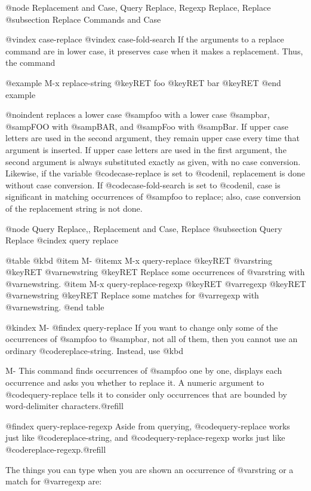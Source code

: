 {{{{{{{{{{{{{{{{{{{@node Replacement and Case, Query Replace, Regexp Replace, Replace
@subsection Replace Commands and Case

@vindex case-replace
@vindex case-fold-search
  If the arguments to a replace command are in lower case, it preserves
case when it makes a replacement.  Thus, the command

@example
M-x replace-string @key{RET} foo @key{RET} bar @key{RET}
@end example

@noindent
replaces a lower case @samp{foo} with a lower case @samp{bar}, @samp{FOO}
with @samp{BAR}, and @samp{Foo} with @samp{Bar}.  If upper case letters are
used in the second argument, they remain upper case every time that
argument is inserted.  If upper case letters are used in the first
argument, the second argument is always substituted exactly as given, with
no case conversion.  Likewise, if the variable @code{case-replace} is set
to @code{nil}, replacement is done without case conversion.  If
@code{case-fold-search} is set to @code{nil}, case is significant in
matching occurrences of @samp{foo} to replace; also, case conversion of the
replacement string is not done.

@node Query Replace,, Replacement and Case, Replace
@subsection Query Replace
@cindex query replace

@table @kbd
@item M-%
@itemx M-x query-replace @key{RET} @var{string} @key{RET} @var{newstring} @key{RET}
Replace some occurrences of @var{string} with @var{newstring}.
@item M-x query-replace-regexp @key{RET} @var{regexp} @key{RET} @var{newstring} @key{RET}
Replace some matches for @var{regexp} with @var{newstring}.
@end table

@kindex M-%
@findex query-replace
  If you want to change only some of the occurrences of @samp{foo} to
@samp{bar}, not all of them, then you cannot use an ordinary
@code{replace-string}.  Instead, use @kbd{M-%
This command finds occurrences of @samp{foo} one by one, displays each
occurrence and asks you whether to replace it.  A numeric argument to
@code{query-replace} tells it to consider only occurrences that are bounded
by word-delimiter characters.@refill

@findex query-replace-regexp
  Aside from querying, @code{query-replace} works just like
@code{replace-string}, and @code{query-replace-regexp} works
just like @code{replace-regexp}.@refill

  The things you can type when you are shown an occurrence of @var{string}
or a match for @var{regexp} are:

}}}}}}}}}}}}}}}}}}}}
